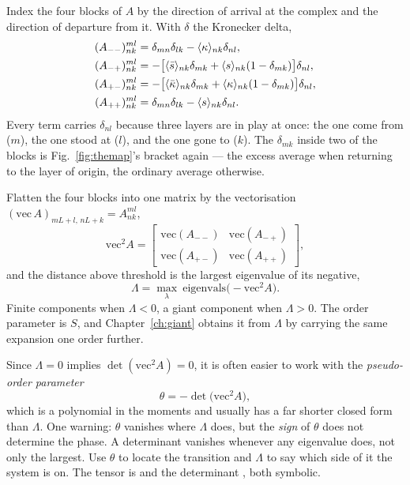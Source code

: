 Index the four blocks of $A$ by the direction of arrival at the complex and the
direction of departure from it. With $\delta$ the Kronecker delta,
\begin{align*}
  (A_{--})^{ml}_{nk}&=\delta_{mn}\delta_{lk}-\langle \kappa \rangle_{nk}\delta_{nl},\\
  (A_{-+})^{ml}_{nk}&=-\bigl[\langle \bar s \rangle_{nk}\delta_{mk}
                      +\langle s \rangle_{nk}(1-\delta_{mk})\bigr]\delta_{nl},\\
  (A_{+-})^{ml}_{nk}&=-\bigl[\langle \bar\kappa \rangle_{nk}\delta_{mk}
                      +\langle \kappa \rangle_{nk}(1-\delta_{mk})\bigr]\delta_{nl},\\
  (A_{++})^{ml}_{nk}&=\delta_{mn}\delta_{lk}-\langle s \rangle_{nk}\delta_{nl}.
\end{align*}
Every term carries $\delta_{nl}$ because three layers are in play at once: the
one come from ($m$), the one stood at ($l$), and the one gone to ($k$). The
$\delta_{mk}$ inside two of the blocks is Fig.~\ref{fig:themap}'s bracket again
--- the excess average when returning to the layer of origin, the ordinary
average otherwise.

Flatten the four blocks into one matrix by the vectorisation
$(\mathrm{vec}\,A)_{mL+l,\,nL+k}=A^{ml}_{nk}$,
\[
  \mathrm{vec}^{2}A=
  \begin{bmatrix}
    \mathrm{vec}(A_{--}) & \mathrm{vec}(A_{-+})\\
    \mathrm{vec}(A_{+-}) & \mathrm{vec}(A_{++})
  \end{bmatrix},
\]
and the distance above threshold is the largest eigenvalue of its negative,
\[
  \Lambda=\max_{\lambda}\ \mathrm{eigenvals}\bigl(-\mathrm{vec}^{2}A\bigr).
\]
Finite components when $\Lambda<0$, a giant component when $\Lambda>0$. The
order parameter is $S$, and Chapter~\ref{ch:giant} obtains it from $\Lambda$ by
carrying the same expansion one order further.

Since $\Lambda=0$ implies $\det(\mathrm{vec}^{2}A)=0$, it is often easier to work
with the \emph{pseudo-order parameter}
\[
  \theta=-\det\bigl(\mathrm{vec}^{2}A\bigr),
\]
which is a polynomial in the moments and usually has a far shorter closed form
than $\Lambda$. One warning: $\theta$ vanishes where
$\Lambda$ does, but the \emph{sign} of $\theta$ does not determine the phase. A
determinant vanishes whenever any eigenvalue does, not only the largest. Use
$\theta$ to locate the transition and $\Lambda$ to say which side of it the
system is on. The tensor is  and the determinant , both symbolic.

